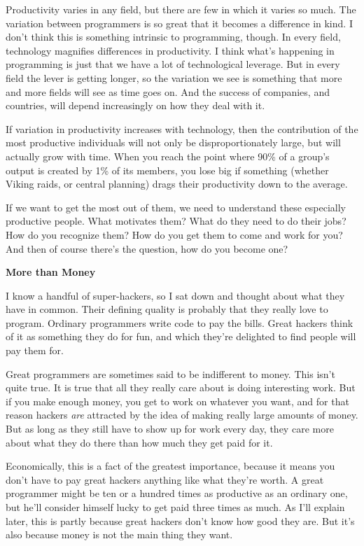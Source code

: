Productivity varies in any field, but there are few in which it varies
so much. The variation between programmers is so great that it becomes a
difference in kind. I don't think this is something intrinsic to
programming, though. In every field, technology magnifies differences in
productivity. I think what's happening in programming is just that we
have a lot of technological leverage. But in every field the lever is
getting longer, so the variation we see is something that more and more
fields will see as time goes on. And the success of companies, and
countries, will depend increasingly on how they deal with it.

If variation in productivity increases with technology, then the
contribution of the most productive individuals will not only be
disproportionately large, but will actually grow with time. When you
reach the point where 90\% of a group's output is created by 1\% of its
members, you lose big if something (whether Viking raids, or central
planning) drags their productivity down to the average.

If we want to get the most out of them, we need to understand these
especially productive people. What motivates them? What do they need to
do their jobs? How do you recognize them? How do you get them to come
and work for you? And then of course there's the question, how do you
become one?

\textbf{More than Money}

I know a handful of super-hackers, so I sat down and thought about what
they have in common. Their defining quality is probably that they really
love to program. Ordinary programmers write code to pay the bills. Great
hackers think of it as something they do for fun, and which they're
delighted to find people will pay them for.

Great programmers are sometimes said to be indifferent to money. This
isn't quite true. It is true that all they really care about is doing
interesting work. But if you make enough money, you get to work on
whatever you want, and for that reason hackers \emph{are} attracted by
the idea of making really large amounts of money. But as long as they
still have to show up for work every day, they care more about what they
do there than how much they get paid for it.

Economically, this is a fact of the greatest importance, because it
means you don't have to pay great hackers anything like what they're
worth. A great programmer might be ten or a hundred times as productive
as an ordinary one, but he'll consider himself lucky to get paid three
times as much. As I'll explain later, this is partly because great
hackers don't know how good they are. But it's also because money is not
the main thing they want.

